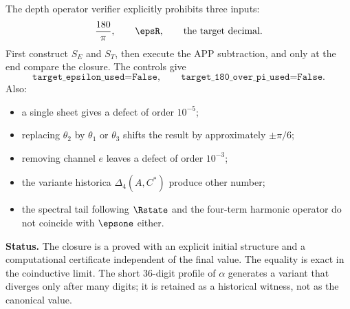 The depth operator verifier explicitly prohibits three inputs:
\[
\frac{180}{\pi},\qquad \epsR,\qquad
\text{the target decimal}.
\]
First construct \(S_E\) and \(S_T\), then execute the APP subtraction, and only at
the end compare the closure. The controls give
\[
\texttt{target\_epsilon\_used=False},\qquad
\texttt{target\_180\_over\_pi\_used=False}.
\]
Also:
\begin{itemize}
\item a single sheet gives a defect of order \(10^{-5}\);
\item replacing \(\theta_2\) by \(\theta_1\) or \(\theta_3\) shifts the
result by approximately \(\pm\pi/6\);
\item removing channel \(e\) leaves a defect of order \(10^{-3}\);
\item the variante historica \(\Delta_4(A,C^*)\) produce other number;
\item the spectral tail following \(\Rstate\) and the four-term harmonic operator do not coincide with \(\epsone\) either.
\end{itemize}

\begin{statusbox}
\textbf{Status.} The closure is a  proved
with an explicit initial structure and a computational certificate independent of the final value.
The equality is exact in the coinductive limit. The short 36-digit profile
of \(\alpha\) generates a variant that diverges only after many digits;
it is retained as a historical witness, not as the canonical value.
\end{statusbox}

